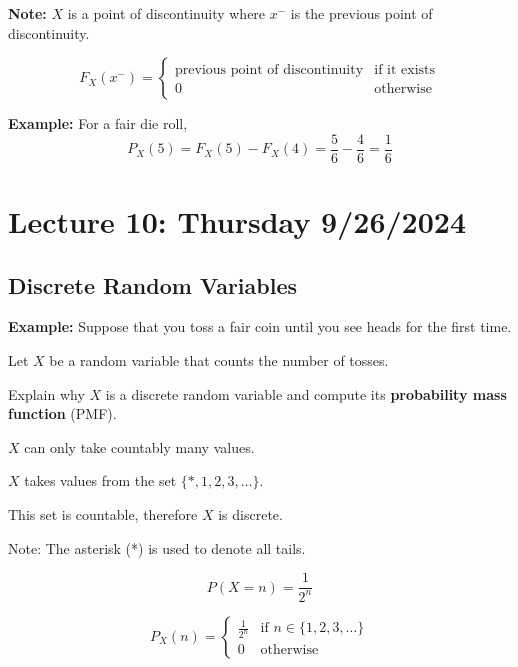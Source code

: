 \documentclass{article}
\begin{document}
    \textbf{Note:} $X$ is a point of discontinuity where $x^-$ is the previous point of discontinuity.
    
    \[
    F_X(x^-) = 
    \begin{cases}
        \text{previous point of discontinuity} & \text{if it exists} \\
        0 & \text{otherwise}
    \end{cases}
    \]

    \textbf{Example:} For a fair die roll,
    \[
    P_X(5) = F_X(5) - F_X(4) = \frac{5}{6} - \frac{4}{6} = \frac{1}{6}
    \]

    
    \pagebreak


    \section*{Lecture 10: Thursday 9/26/2024}

    \subsection*{Discrete Random Variables}

    \textbf{Example:} Suppose that you toss a fair coin until you see heads for the first time.

    Let \(X\) be a random variable that counts the number of tosses.

    Explain why \(X\) is a discrete random variable and compute its \textbf{probability mass function} (PMF).

    \(X\) can only take countably many values. 

    \(X\) takes values from the set \(\{*, 1, 2, 3, \ldots\}\).

    This set is countable, therefore \(X\) is discrete.

    Note: The asterisk (*) is used to denote all tails.

    \[
        P(X = n) = \frac{1}{2^n}
    \]

    \[
        P_X(n) = 
        \begin{cases} 
            \frac{1}{2^n} & \text{if } n \in \{1, 2, 3, \ldots\} \\
            0 & \text{otherwise}
        \end{cases}
    \]
\end{document}
